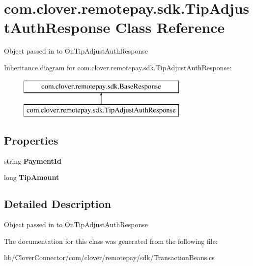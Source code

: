 \hypertarget{classcom_1_1clover_1_1remotepay_1_1sdk_1_1_tip_adjust_auth_response}{}\section{com.\+clover.\+remotepay.\+sdk.\+Tip\+Adjust\+Auth\+Response Class Reference}
\label{classcom_1_1clover_1_1remotepay_1_1sdk_1_1_tip_adjust_auth_response}


Object passed in to On\+Tip\+Adjust\+Auth\+Response  


Inheritance diagram for com.\+clover.\+remotepay.\+sdk.\+Tip\+Adjust\+Auth\+Response\+:\begin{figure}[H]
\begin{center}
\leavevmode
\includegraphics[height=2.000000cm]{classcom_1_1clover_1_1remotepay_1_1sdk_1_1_tip_adjust_auth_response}
\end{center}
\end{figure}
\subsection*{Properties}
\begin{DoxyCompactItemize}
\item 
\mbox{\label{classcom_1_1clover_1_1remotepay_1_1sdk_1_1_tip_adjust_auth_response_ab7f05ccc65c77b1a91f43431f8422851}} 
string {\bfseries Payment\+Id}
\item 
\mbox{\label{classcom_1_1clover_1_1remotepay_1_1sdk_1_1_tip_adjust_auth_response_aa4bcc6cfb9fd980903b4ddb3f0a33be2}} 
long {\bfseries Tip\+Amount}
\end{DoxyCompactItemize}


\subsection{Detailed Description}
Object passed in to On\+Tip\+Adjust\+Auth\+Response 



The documentation for this class was generated from the following file\+:\begin{DoxyCompactItemize}
\item 
lib/\+Clover\+Connector/com/clover/remotepay/sdk/Transaction\+Beans.\+cs\end{DoxyCompactItemize}
